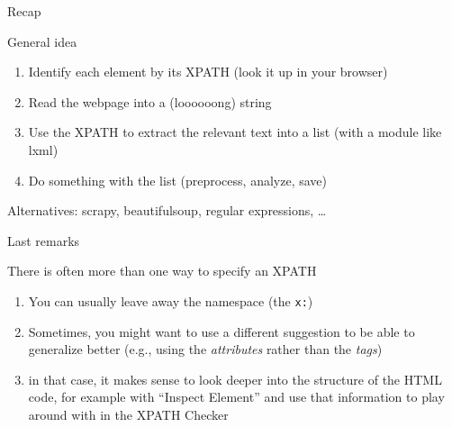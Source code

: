 \documentclass{beamer}
\begin{document}
\begin{frame}{Recap}
\begin{block}{General idea}
\begin{enumerate}
\item Identify each element by its XPATH (look it up in your browser) 
\item Read the webpage into a (loooooong) string
\item Use the XPATH to extract the relevant text into a list (with a module like lxml)
\item Do something with the list (preprocess, analyze, save)
\end{enumerate}
\footnotesize{Alternatives: scrapy, beautifulsoup, regular expressions, \ldots}
\end{block}
\end{frame}




\begin{frame}{Last remarks}
	\begin{block}{There is often more than one way to specify an XPATH}
		\begin{enumerate}
			\item You can usually leave away the namespace (the \texttt{x:})
			\item Sometimes, you might want to use a different suggestion to be able to generalize better (e.g., using the \emph{attributes} rather than the \emph{tags})
			\item in that case, it makes sense to look deeper into the structure of the HTML code, for example with ``Inspect Element'' and use that information to play around with in the XPATH Checker
		\end{enumerate}
	\end{block}
\end{frame}


{
	\begin{frame}[plain]
	\end{frame}
}
\end{document}
